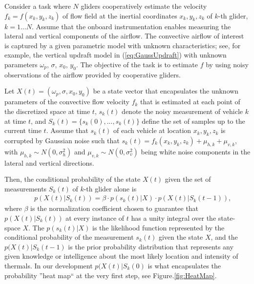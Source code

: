 \documentclass{ifacconf}
\begin{document}
Consider a task where $N$ gliders cooperatively estimate the velocity
$f_k=f(x_k,y_k,z_k)$ of flow field at the inertial coordinates $x_k,y_k,z_k$
of $k$-th glider, $k=1...N$. Assume that the onboard instrumentation enables measuring the lateral and vertical components of the airflow. The convective
airflow of interest is captured by a given parametric model with unknown
characteristics; see, for example, the vertical updraft model in
(\ref{eq:GaussUpdraft}) with unknown parameters $\omega_p$, $\sigma$, $x_0$,
$y_0$. The objective of the task is to estimate $f$ by using noisy observations of the airflow provided by cooperative gliders.

Let $X(t)=(\omega_p, \sigma, x_0, y_0)$ be a state vector that encapsulates
the unknown parameters of the convective flow velocity $f_k$ that is
estimated at each point of the discretized space at time $t$, $s_k(t)$ denote
the noisy measurement of vehicle $k$ at time $t$, and
$S_k(t)=\{s_k(0),...,s_k(t)\}$ define the set of samples up to the current time $t$. Assume that $s_k(t)$ of each vehicle at location $x_k,y_k,z_k$ is
corrupted by Gaussian noise such that $s_k(t)=f_k(x_k,y_k,z_k)+\mu_{h,k}+\mu_{v,k}$, with $\mu_{h,k}\sim N(0,\sigma^2_h)$ and $\mu_{v,k}\sim N(0,\sigma^2_v)$ being white noise components in the lateral and vertical directions.

Then, the conditional probability of the state $X(t)$ given the set of
measurements $S_k(t)$ of $k$-th glider alone is
\begin{eqnarray}
    && p(X(t)\vert S_k(t))=\beta \cdot p(s_k(t) \vert X)\cdot p(X(t) \vert S_k(t-1)),
    \label{eq:BayesProb}
\end{eqnarray}
where $\beta$ is the normalization coefficient chosen to guarantee that
$p(X(t)\vert S_k(t))$ at every instance of $t$ has a unity integral over the
state-space $X$.  The $p(s_k(t) \vert X)$ is the likelihood function
represented by the conditional probability of the measurement $s_k(t)$ given
the state $X$, and the $p(X(t) \vert S_k(t-1)$ is the prior probability
distribution that represents any given knowledge or intelligence about the most likely location and intensity of thermals. In our development $p(X(t) \vert S_k(0)$ is what encapsulates the probability ''heat map`` at the very first step, see Figure.\ref{fig:HeatMap}.
\end{document}
